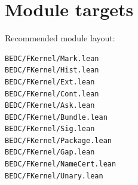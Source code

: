 \section{Module targets}

Recommended module layout:
\begin{verbatim}
BEDC/FKernel/Mark.lean
BEDC/FKernel/Hist.lean
BEDC/FKernel/Ext.lean
BEDC/FKernel/Cont.lean
BEDC/FKernel/Ask.lean
BEDC/FKernel/Bundle.lean
BEDC/FKernel/Sig.lean
BEDC/FKernel/Package.lean
BEDC/FKernel/Gap.lean
BEDC/FKernel/NameCert.lean
BEDC/FKernel/Unary.lean
\end{verbatim}
